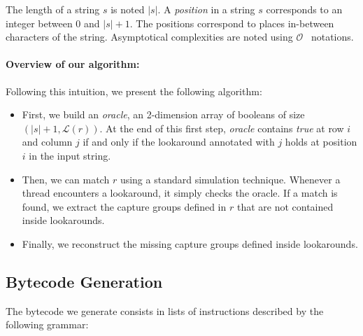 \documentclass{article}
\def\size#1{\ensuremath{|#1|}}
\def\looknb#1{\ensuremath{\mathcal{L}(#1)}}
\def\bigo{\ensuremath{\mathcal{O}}}
\begin{document}
The length of a string $s$ is noted \size{s}.
A \textit{position} in a string $s$ corresponds to an integer between 0 and $\size{s}+1$.
The positions correspond to places in-between characters of the string.
Asymptotical complexities are noted using \bigo~ notations.



\paragraph{Overview of our algorithm:}

Following this intuition, we present the following algorithm:

\begin{itemize}
\item First, we build an \textit{oracle}, an 2-dimension array of booleans of size $(\size{s}+1, \looknb{r})$.
  At the end of this first step, \textit{oracle} contains \textit{true} at row $i$ and column $j$ if and only if the lookaround annotated with $j$ holds at position $i$ in the input string.
\item Then, we can match $r$ using a standard simulation technique. Whenever a thread encounters a lookaround, it simply checks the oracle. If a match is found, we extract the capture groups defined in $r$ that are not contained inside lookarounds.
\item Finally, we reconstruct the missing capture groups defined inside lookarounds.
\end{itemize}

  
\subsection{Bytecode Generation}

The bytecode we generate consists in lists of instructions described by the following grammar:

\def\instr{\ensuremath{\mathit{e}}}
\def\lbl{\ensuremath{\mathit{l}}}
\def\reg{\ensuremath{\mathit{reg}}}
\def\lid{\ensuremath{\mathit{lid}}}
\end{document}
